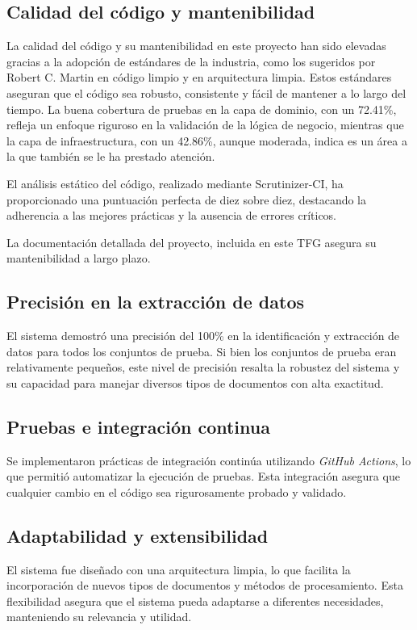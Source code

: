 \subsection {Calidad del código y mantenibilidad}

La calidad del código y su mantenibilidad en este proyecto han sido elevadas gracias a la adopción de estándares de la
industria, como los sugeridos por Robert C. Martin en código limpio y en arquitectura limpia.
Estos estándares aseguran que el código sea robusto, consistente y fácil de mantener a lo largo del tiempo.
La buena cobertura de pruebas en la capa de dominio, con un 72.41\%, refleja un enfoque riguroso en la validación de la
lógica de negocio, mientras que la capa de infraestructura, con un 42.86\%, aunque moderada, indica es un área a la
que también se le ha prestado atención.

El análisis estático del código, realizado mediante Scrutinizer-CI, ha proporcionado una puntuación perfecta de diez
sobre diez, destacando la adherencia a las mejores prácticas y la ausencia de errores críticos.

La documentación detallada del proyecto, incluida en este TFG asegura su mantenibilidad a largo plazo.

\subsection {Precisión en la extracción de datos}

El sistema demostró una precisión del 100\% en la identificación y extracción de datos para todos los conjuntos de
prueba.
Si bien los conjuntos de prueba eran relativamente pequeños, este nivel de precisión resalta la robustez del sistema y
su capacidad para manejar diversos tipos de documentos con alta exactitud.

\subsection {Pruebas e integración continua}

Se implementaron prácticas de integración continúa utilizando \textit{GitHub Actions}, lo que permitió automatizar la
ejecución de pruebas.
Esta integración asegura que cualquier cambio en el código sea rigurosamente probado y validado.

\subsection {Adaptabilidad y extensibilidad}

El sistema fue diseñado con una arquitectura limpia, lo que facilita la incorporación de nuevos tipos de documentos y
métodos de procesamiento.
Esta flexibilidad asegura que el sistema pueda adaptarse a diferentes necesidades, manteniendo su relevancia y utilidad.